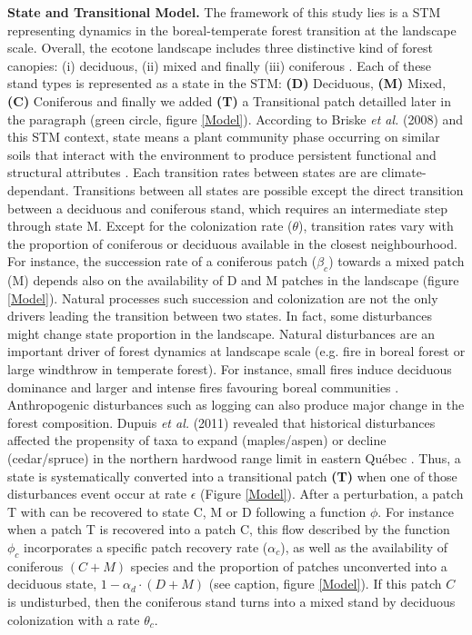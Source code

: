 \textbf{State and Transitional Model.} The framework of this study lies is a
STM representing dynamics in the boreal-temperate forest transition at the
landscape scale.  Overall, the ecotone landscape includes three distinctive
kind of forest canopies: (i) deciduous, (ii) mixed and finally (iii)
coniferous \cite{Fisichelli2013}.  Each of these stand types is represented as
a state in the STM: \textbf{(D)} Deciduous, \textbf{(M)} Mixed, \textbf{(C)}
Coniferous and finally we added \textbf{(T)} a Transitional patch detailled
later in the paragraph (green circle, figure \ref{Model}).  According to
Briske\textit{ et al.} (2008) and this STM context, state means a plant
community phase occurring on similar soils that interact with the environment
to produce persistent functional and structural attributes \cite{Briske2008}.
Each transition rates between states are  are climate-dependant. Transitions
between all states are possible except the direct transition between a
deciduous and coniferous stand, which requires an intermediate step through
state M. Except for the colonization rate ($\theta$), transition rates vary
with the proportion of coniferous or deciduous available in the closest
neighbourhood. For instance, the succession rate of a coniferous patch
($\beta_c$) towards a mixed patch (M) depends also on the availability of D
and M patches in the landscape (figure \ref{Model}).  Natural processes such
succession and colonization  are not the only drivers leading the transition
between two states. In fact, some disturbances might change state proportion
in the landscape. Natural disturbances are an important driver of forest
dynamics at landscape scale (e.g. fire in boreal forest or large windthrow in
temperate forest). For instance, small fires induce deciduous dominance and
larger and intense fires favouring boreal communities \cite{Bergeron2004}.
Anthropogenic disturbances such as logging can also produce major change in
the forest composition. Dupuis \textit{et al.} (2011) revealed that historical
disturbances affected the propensity of taxa to expand (maples/aspen) or
decline (cedar/spruce) in the northern hardwood range limit in eastern Québec
\cite{Dupuis2011}. Thus, a state is systematically converted into a
transitional patch \textbf{(T)} when one of those disturbances event occur at
rate $\epsilon$ (Figure \ref{Model}). After a perturbation, a patch T with can
be recovered to state C, M or D following a function $\phi$. For instance when
a patch T is recovered into a patch C, this flow described by the function
$\phi_c$ incorporates a specific patch recovery rate ($\alpha_c$), as well as
the availability of coniferous $(C + M)$ species and the proportion of patches
unconverted into a deciduous state, $1- \alpha_d \cdot (D + M)$ (see caption,
figure \ref{Model}). If this patch $C$ is undisturbed, then the coniferous
stand turns into a mixed stand by deciduous colonization with a rate
$\theta_c$.

